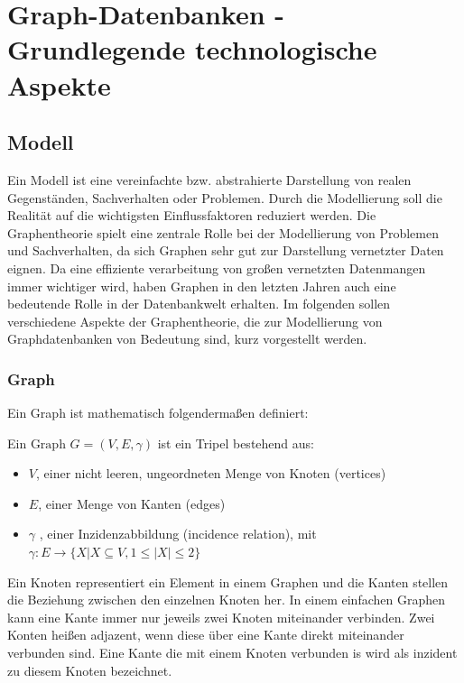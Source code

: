 \chapter{Graph-Datenbanken - Grundlegende technologische Aspekte}
\section{Modell}
Ein Modell ist eine vereinfachte bzw. abstrahierte Darstellung von realen Gegenständen, Sachverhalten oder Problemen.
Durch die Modellierung soll die Realität auf die wichtigsten Einflussfaktoren reduziert werden.
Die Graphentheorie spielt eine zentrale Rolle bei der Modellierung von Problemen und Sachverhalten, da sich Graphen sehr gut zur Darstellung vernetzter Daten eignen.
Da eine effiziente verarbeitung von großen vernetzten Datenmangen immer wichtiger wird, haben Graphen in den letzten Jahren auch eine bedeutende Rolle in der Datenbankwelt erhalten.
Im folgenden sollen verschiedene Aspekte der Graphentheorie, die zur Modellierung von Graphdatenbanken von Bedeutung sind, kurz vorgestellt werden.
\subsection{Graph}
Ein Graph ist mathematisch folgendermaßen definiert:
\begin{definition}
	Ein $\text{Graph } G=(V,E,\gamma)$ ist ein Tripel bestehend aus:
	\begin{itemize}
		\item $V$, einer nicht leeren, ungeordneten Menge von Knoten (vertices)
		\item $E$, einer Menge von Kanten (edges)
		\item $\gamma$ , einer Inzidenzabbildung (incidence relation), mit\\
		$\gamma : E \longrightarrow \{X | X \subseteq V, 1 \leq |X| \leq 2\}$
	\end{itemize}
\end{definition}
Ein Knoten representiert ein Element in einem Graphen und die Kanten stellen die Beziehung zwischen den einzelnen Knoten her.
In einem einfachen Graphen kann eine Kante immer nur jeweils zwei Knoten miteinander verbinden.
Zwei Konten heißen adjazent, wenn diese über eine Kante direkt miteinander verbunden sind.
Eine Kante die mit einem Knoten verbunden is wird als inzident zu diesem Knoten bezeichnet.\cite{knauer2015diskrete}

